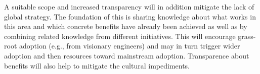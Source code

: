 A suitable scope and increased transparency will in addition mitigate the lack of global strategy. The foundation of this is sharing knowledge about what works in this area and which concrete benefits have already been achieved as well as by combining related knowledge from different initiatives. This will encourage grass-root adoption (e.g., from visionary engineers) and may in turn trigger wider adoption and then resources toward mainstream adoption. Transparence about benefits will also help to mitigate the cultural impediments.

